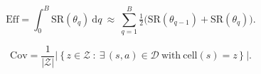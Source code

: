 \begin{equation}
\mathrm{Eff}=\int_{0}^{B}\mathrm{SR}(\theta_{q})\ \mathrm{d}q
\ \approx\ \sum_{q=1}^{B}\tfrac12\big(\mathrm{SR}(\theta_{q-1})+\mathrm{SR}(\theta_{q})\big).
\label{eq:eff}
\end{equation}

\begin{equation}
\mathrm{Cov}=\frac{1}{|\mathcal{Z}|}\Big|\ \big\{\,z\in\mathcal{Z}\ :\ \exists\,(s,a)\in\mathcal{D}\ \text{with}\ \mathrm{cell}(s)=z\,\big\}\ \Big|.
\label{eq:cov}
\end{equation}
